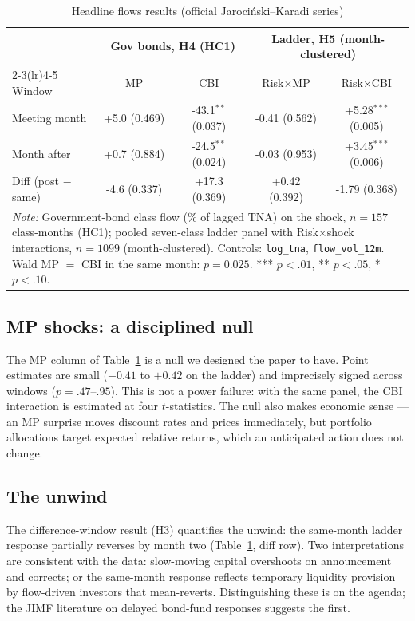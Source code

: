 \documentclass[11pt]{article}
\newcommand{\jk}{Jaroci\'{n}ski--Karadi}
\begin{document}
\begin{table}[H]
\centering\small
\caption{Headline flows results (official \jk{} series)}
\begin{tabular}{lcccc}
\toprule
 & \multicolumn{2}{c}{Gov bonds, H4 (HC1)} & \multicolumn{2}{c}{Ladder, H5 (month-clustered)} \\
\cmidrule(lr){2-3}\cmidrule(lr){4-5}
Window & MP & CBI & Risk$\times$MP & Risk$\times$CBI \\
\midrule
Meeting month & +5.0 (0.469) & -43.1$^{**}$ (0.037) & -0.41 (0.562) & +5.28$^{***}$ (0.005) \\
Month after & +0.7 (0.884) & -24.5$^{**}$ (0.024) & -0.03 (0.953) & +3.45$^{***}$ (0.006) \\
Diff (post $-$ same) & -4.6 (0.337) & +17.3 (0.369) & +0.42 (0.392) & -1.79 (0.368) \\
\midrule
\multicolumn{5}{p{.92\linewidth}}{\footnotesize \emph{Note:} Government-bond class flow (\% of lagged TNA) on the shock, $n=157$ class-months (HC1); pooled seven-class ladder panel with Risk$\times$shock interactions, $n=1099$ (month-clustered). Controls: \texttt{log\_tna}, \texttt{flow\_vol\_12m}. Wald MP $=$ CBI in the same month: $p=0.025$. *** $p<.01$, ** $p<.05$, * $p<.10$.} \\
\bottomrule
\end{tabular}
\label{tab:official}
\end{table}

\subsection{MP shocks: a disciplined null}\label{sec:mpnull}

The MP column of Table~\ref{tab:official} is a null we designed the paper to
have. Point estimates are small ($-0.41$ to $+0.42$ on the ladder) and
imprecisely signed across windows ($p=.47$--$.95$). This is not a power
failure: with the same panel, the CBI interaction is estimated at four
$t$-statistics. The null also makes economic sense --- an MP surprise moves
discount rates and prices immediately, but portfolio allocations target
expected relative returns, which an anticipated action does not change.

\subsection{The unwind}\label{sec:unwind}

The difference-window result (H3) quantifies the unwind: the same-month
ladder response partially reverses by month two (Table~\ref{tab:official},
diff row). Two interpretations are
consistent with the data: slow-moving capital overshoots on announcement and
corrects; or the same-month response reflects temporary liquidity provision
by flow-driven investors that mean-reverts. Distinguishing these is on the
agenda; the JIMF literature on delayed bond-fund responses
\citep{BROOKS_2018} suggests the first.
\end{document}
